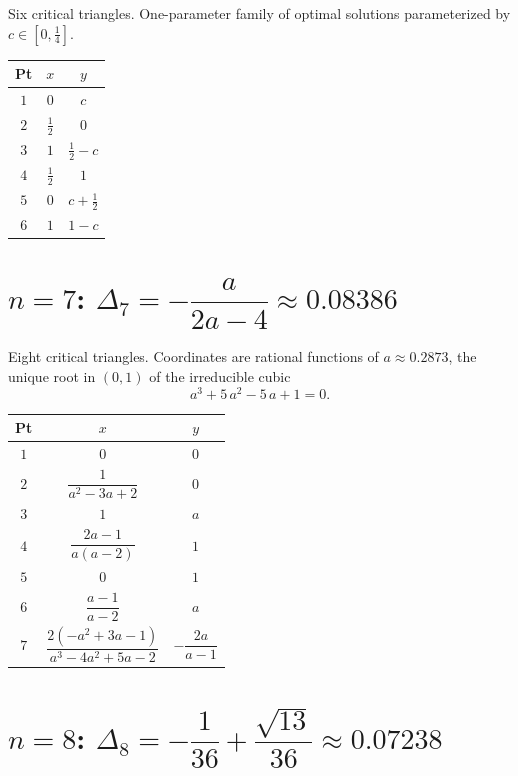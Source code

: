 \documentclass[11pt]{article}
\begin{document}
Six critical triangles. One-parameter family of optimal solutions
parameterized by $c \in [0, \tfrac{1}{4}]$.

\begin{center}
\begin{tabular}{c c c}
\toprule
Pt & $x$ & $y$ \\
\midrule
$1$ & $0$ & $c$ \\[4pt]
$2$ & $\frac{1}{2}$ & $0$ \\[4pt]
$3$ & $1$ & $\frac{1}{2} - c$ \\[4pt]
$4$ & $\frac{1}{2}$ & $1$ \\[4pt]
$5$ & $0$ & $c + \frac{1}{2}$ \\[4pt]
$6$ & $1$ & $1-c$ \\
\bottomrule
\end{tabular}
\end{center}

\section*{$n = 7$: \quad $\Delta_7 = -\dfrac{a}{2a-4} \approx 0.08386$}

Eight critical triangles. Coordinates are rational functions of
$a \approx 0.2873$, the unique root in $(0,1)$ of the irreducible cubic
\[
  a^3 + 5\,a^2 - 5\,a + 1 = 0.
\]

\begin{center}
\begin{tabular}{c c c}
\toprule
Pt & $x$ & $y$ \\
\midrule
$1$ & $0$ & $0$ \\[4pt]
$2$ & $\dfrac{1}{a^2-3a+2}$ & $0$ \\[8pt]
$3$ & $1$ & $a$ \\[4pt]
$4$ & $\dfrac{2a-1}{a(a-2)}$ & $1$ \\[8pt]
$5$ & $0$ & $1$ \\[4pt]
$6$ & $\dfrac{a-1}{a-2}$ & $a$ \\[8pt]
$7$ & $\dfrac{2(-a^2+3a-1)}{a^3-4a^2+5a-2}$ & $-\dfrac{2a}{a-1}$ \\[8pt]
\bottomrule
\end{tabular}
\end{center}

\section*{$n = 8$: \quad $\Delta_8 = -\dfrac{1}{36}+\dfrac{\sqrt{13}}{36} \approx 0.07238$}
\end{document}
